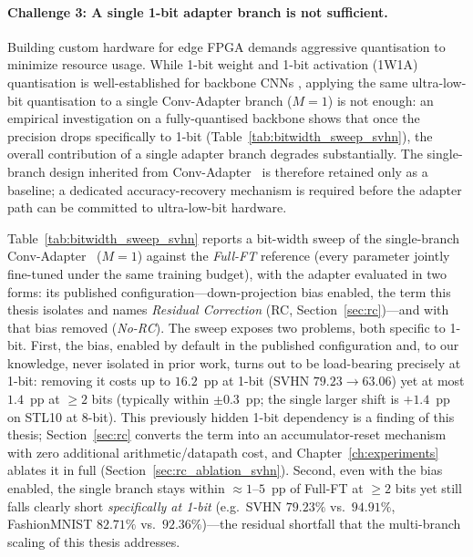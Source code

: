 \documentclass[12pt, a4paper]{report}
\numberwithin{equation}{chapter}
\numberwithin{figure}{chapter}
\numberwithin{table}{chapter}
\numberwithin{algorithm}{chapter}
\begin{document}
\paragraph{Challenge 3: A single 1-bit adapter branch is not sufficient.}
Building custom hardware for edge FPGA demands aggressive quantisation to minimize resource usage. While 1-bit weight and 1-bit activation (1W1A) quantisation is well-established for backbone CNNs \cite{Rastegari2016XNOR, Hubara2016BinarizedNN}, applying the same ultra-low-bit quantisation to a single Conv-Adapter branch ($M{=}1$) is not enough: an empirical investigation on a fully-quantised backbone shows that once the precision drops specifically to 1-bit (Table~\ref{tab:bitwidth_sweep_svhn}), the overall contribution of a single adapter branch degrades substantially. The single-branch design inherited from Conv-Adapter~\cite{Chen2024ConvAdapter} is therefore retained only as a baseline; a dedicated accuracy-recovery mechanism is required before the adapter path can be committed to ultra-low-bit hardware.

Table~\ref{tab:bitwidth_sweep_svhn} reports a bit-width sweep of the single-branch Conv-Adapter~\cite{Chen2024ConvAdapter} ($M{=}1$) against the \emph{Full-FT} reference (every parameter jointly fine-tuned under the same training budget), with the adapter evaluated in two forms: its published configuration---down-projection bias enabled, the term this thesis isolates and names \emph{Residual Correction} (RC, Section~\ref{sec:rc})---and with that bias removed (\emph{No-RC}). The sweep exposes two problems, both specific to 1-bit. First, the bias, enabled by default in the published configuration and, to our knowledge, never isolated in prior work, turns out to be load-bearing precisely at 1-bit: removing it costs up to $16.2$~pp at 1-bit (SVHN $79.23 \to 63.06$) yet at most $1.4$~pp at $\geq 2$ bits (typically within $\pm 0.3$~pp; the single larger shift is $+1.4$~pp on STL10 at 8-bit). This previously hidden 1-bit dependency is a finding of this thesis; Section~\ref{sec:rc} converts the term into an accumulator-reset mechanism with zero additional arithmetic/datapath cost, and Chapter~\ref{ch:experiments} ablates it in full (Section~\ref{sec:rc_ablation_svhn}). Second, even with the bias enabled, the single branch stays within $\approx 1$--$5$~pp of Full-FT at $\geq 2$ bits yet still falls clearly short \emph{specifically at 1-bit} (e.g.\ SVHN $79.23\%$ vs.\ $94.91\%$, FashionMNIST $82.71\%$ vs.\ $92.36\%$)---the residual shortfall that the multi-branch scaling of this thesis addresses.
\end{document}
